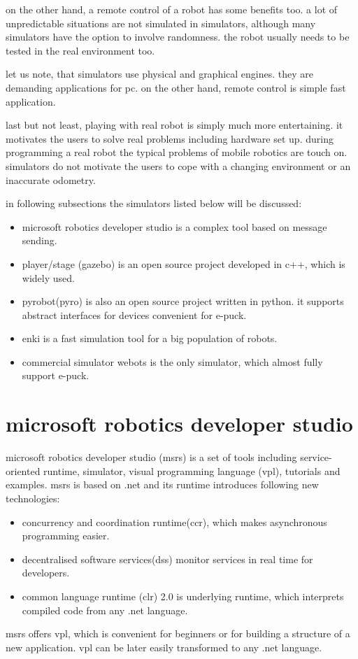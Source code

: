   on the other hand, a remote control of a robot has some benefits too. 
  a lot of unpredictable situations are not simulated in simulators, although 
  many simulators have the option to involve randomness. the robot usually
  needs to be tested in the real environment too.
  
  let us note, that simulators use physical and graphical engines. they are demanding applications
  for pc. 
  on the other hand, remote control is simple fast application.
  
  last but not least, playing with real robot is simply much more entertaining. 	
  it motivates the users to solve real problems including hardware set up. 
  during programming a real robot the typical problems of mobile robotics are touch on.
  simulators do not motivate the users to cope with a changing environment or an inaccurate odometry.
  
  in following subsections the simulators listed below will be discussed:
  \begin{itemize}
  \item microsoft robotics developer studio\cite{msrs} is a complex tool based on message sending.
  \item player/stage\cite{player} (gazebo) is an open source project developed in c++, which is widely used.
  \item pyrobot(pyro)\cite{pyro} is also an open source project written in python. it supports abstract
  interfaces for devices convenient for e-puck.
  \item enki\cite{enki} is a fast simulation tool for a big population of robots.
  \item commercial simulator webots\cite{webots} is the only simulator, which almost fully support e-puck. 
  \end{itemize}
\section{microsoft robotics developer studio\cite{msrs}} 
  microsoft robotics developer studio (msrs) is a set of tools including service-oriented runtime,
  simulator, visual programming language (vpl),
  tutorials and examples. msrs is based on .net and its runtime introduces following new technologies:
  \begin{itemize}
  \item concurrency and coordination runtime(ccr), which makes asynchronous programming easier.
  \item decentralised software services(dss) monitor services in real time for developers.
  \item common language runtime (clr) 2.0 is underlying runtime, 
          which interprets compiled code from any .net language.
  \end{itemize}	
  msrs offers vpl, which is convenient for beginners or for building a structure of a new application.
  vpl can be later easily transformed to any .net language.
  
